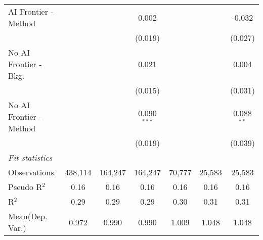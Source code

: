 \begin{tabular}{lcccccc}
   AI Frontier - Method    &               &               & 0.002         &               &               & -0.032\\   
                           &               &               & (0.019)       &               &               & (0.027)\\   
   No AI Frontier - Bkg.   &               &               & 0.021         &               &               & 0.004\\   
                           &               &               & (0.015)       &               &               & (0.031)\\   
   No AI Frontier - Method &               &               & 0.090$^{***}$ &               &               & 0.088$^{**}$\\   
                           &               &               & (0.019)       &               &               & (0.039)\\   
   \midrule
   \emph{Fit statistics}\\
   Observations            & 438,114       & 164,247       & 164,247       & 70,777        & 25,583        & 25,583\\  
   Pseudo R$^2$            & 0.16          & 0.16          & 0.16          & 0.16          & 0.16          & 0.16\\  
   R$^2$                   & 0.29          & 0.29          & 0.29          & 0.30          & 0.31          & 0.31\\  
Mean(Dep. Var.) & 0.972 & 0.990 & 0.990 & 1.009 & 1.048 & 1.048 \\
   

\end{tabular}
